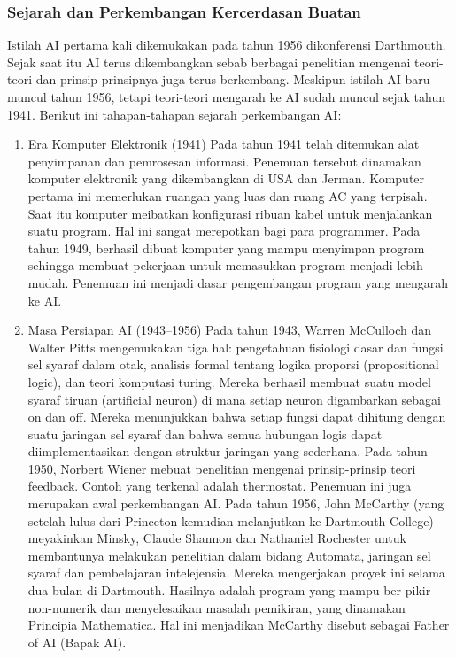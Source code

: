 \subsubsection{Sejarah dan Perkembangan Kercerdasan Buatan}
\hfill\break
Istilah AI pertama kali dikemukakan pada tahun 1956 dikonferensi Darthmouth. Sejak saat itu AI terus dikembangkan sebab berbagai penelitian mengenai teori-teori dan prinsip-prinsipnya juga terus berkembang. Meskipun istilah AI baru muncul tahun 1956, tetapi teori-teori mengarah ke AI sudah muncul sejak tahun 1941. Berikut ini tahapan-tahapan sejarah perkembangan AI:
\begin{enumerate}
	\item Era Komputer Elektronik (1941)
	\hfill\break
	Pada tahun 1941 telah ditemukan alat penyimpanan dan pemrosesan informasi. Penemuan tersebut dinamakan komputer elektronik yang dikembangkan di USA dan Jerman. Komputer pertama ini memerlukan ruangan yang luas dan ruang AC yang terpisah. Saat itu komputer meibatkan konfigurasi ribuan kabel untuk menjalankan suatu program. Hal ini sangat merepotkan bagi para programmer. Pada tahun 1949, berhasil dibuat komputer yang mampu menyimpan program sehingga membuat pekerjaan untuk memasukkan program menjadi lebih mudah. Penemuan ini menjadi dasar pengembangan program yang mengarah ke AI.

	\item Masa Persiapan AI (1943–1956)
	\hfill\break
	Pada tahun 1943, Warren McCulloch dan Walter Pitts mengemukakan tiga hal: pengetahuan fisiologi dasar dan fungsi sel syaraf dalam otak, analisis formal tentang logika proporsi (propositional logic), dan teori komputasi turing. Mereka berhasil membuat suatu model syaraf tiruan (artificial neuron) di mana setiap neuron digambarkan sebagai on dan off. Mereka menunjukkan bahwa setiap fungsi dapat dihitung dengan suatu jaringan sel syaraf dan bahwa semua hubungan logis dapat diimplementasikan dengan struktur jaringan yang sederhana.
	\noindent
	Pada tahun 1950, Norbert Wiener mebuat penelitian mengenai prinsip-prinsip teori feedback. Contoh yang terkenal adalah thermostat. Penemuan ini juga merupakan awal perkembangan AI. Pada tahun 1956, John McCarthy (yang setelah lulus dari Princeton kemudian melanjutkan ke Dartmouth College) meyakinkan Minsky, Claude Shannon dan Nathaniel Rochester untuk membantunya melakukan penelitian dalam bidang Automata, jaringan sel syaraf dan pembelajaran intelejensia. Mereka mengerjakan proyek ini selama dua bulan di Dartmouth. Hasilnya adalah program yang mampu ber-pikir non-numerik dan menyelesaikan masalah pemikiran, yang dinamakan Principia Mathematica. Hal ini menjadikan McCarthy disebut sebagai Father of AI (Bapak AI).


\end{enumerate}
